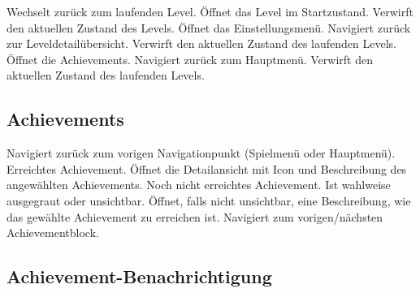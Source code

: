 \begin{requirements}
 Wechselt zurück zum laufenden Level.
 Öffnet das Level im Startzustand. Verwirft den aktuellen Zustand des Levels.
 Öffnet das Einstellungsmenü.
 Navigiert zurück zur Leveldetailübersicht. Verwirft den aktuellen Zustand des laufenden Levels.
 Öffnet die Achievements.
 Navigiert zurück zum Hauptmenü. Verwirft den aktuellen Zustand des laufenden Levels.
\end{requirements}

\subsection{Achievements}

\begin{center}
\setlength\fboxsep{20pt}
\setlength\fboxrule{1pt}
\end{center}

\begin{requirements}
 Navigiert zurück zum vorigen Navigationpunkt (Spielmenü oder Hauptmenü).
 Erreichtes Achievement. Öffnet die Detailansicht mit Icon und Beschreibung des angewählten Achievements.
 Noch nicht erreichtes Achievement. Ist wahlweise ausgegraut oder unsichtbar. Öffnet, falls nicht unsichtbar, eine Beschreibung, wie das gewählte Achievement zu erreichen ist.
 Navigiert zum vorigen/nächsten Achievementblock.
\end{requirements}

\subsection{Achievement-Benachrichtigung}

